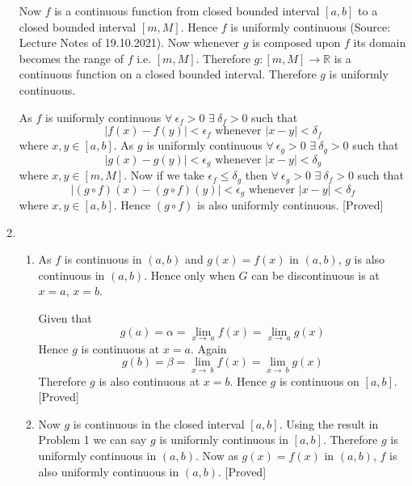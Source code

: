 \documentclass{article}
\newcommand{\mR}{\mathbb{R}}
\begin{document}
\begin{enumerate}
		\hspace{1cm}Now $f$ is a continuous function from closed bounded interval $[a,b]$ to a closed bounded interval $[m,M]$. Hence $f$ is uniformly continuous (Source: Lecture Notes of 19.10.2021). Now whenever $g$ is composed upon $f$ its domain becomes the range of $f$ i.e. $[m,M]$. Therefore $g:[m,M]\to\mR$ is a continuous function on a closed bounded interval. Therefore $g$ is uniformly continuous.
		
		\hspace{1cm}As $f$ is uniformly continuous $\forall\ \epsilon_f>0$ $\exists \ \delta_f>0$ such that $$|f(x)-f(y)|<\epsilon_f\text{ whenever }|x-y|<\delta_f$$where $x,y\in[a,b]$. As $g$ is uniformly continuous $\forall\ \epsilon_g>0$ $\exists \ \delta_g>0$ such that $$|g(x)-g(y)|<\epsilon_g\text{ whenever }|x-y|<\delta_g$$where $x,y\in[m,M]$. Now if we take $\epsilon_f\leq \delta_g$ then $\forall\ \epsilon_g>0$ $\exists \ \delta_f>0$ such that $$|(g\circ f)(x)-(g\circ f)(y)|<\epsilon_g\text{ whenever }|x-y|<\delta_f$$where $x,y\in[a,b]$. Hence $(g\circ f)$ is also uniformly continuous. [Proved]
		\item\begin{enumerate}
			\item As $f$ is continuous in $(a,b)$ and $g(x)=f(x)$ in $(a,b)$, $g$ is also continuous in $(a,b)$. Hence only when $G$ can be discontinuous is at $x=a$, $x=b$.
			
			\hspace{1cm}Given that $$g(a)=\alpha=\lim\limits_{x\to\ a}f(x)=\lim\limits_{x\to\ a}g(x)$$Hence $g$ is continuous at $x=a$. Again  $$g(b)=\beta=\lim\limits_{x\to\ b}f(x)=\lim\limits_{x\to\ b}g(x)$$Therefore $g$ is also continuous at $x=b$. Hence $g$ is continuous on $[a,b]$. [Proved]
			\item Now $g$ is continuous in the closed interval $[a,b]$. Using the result in Problem 1 we can say $g$ is uniformly continuous in $[a,b]$. Therefore $g$ is uniformly continuous in $(a,b)$. Now as $g(x)=f(x)$ in $(a,b)$, $f$ is also uniformly continuous in $(a,b)$. [Proved]
		\end{enumerate}
	\end{enumerate}
\end{document}
